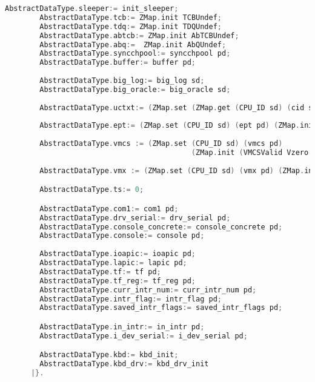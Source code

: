 \begin{lstlisting}[language=C]
        AbstractDataType.sleeper:= init_sleeper;
        AbstractDataType.tcb:= ZMap.init TCBUndef;
        AbstractDataType.tdq:= ZMap.init TDQUndef;
        AbstractDataType.abtcb:= ZMap.init AbTCBUndef;
        AbstractDataType.abq:=  ZMap.init AbQUndef;
        AbstractDataType.syncchpool:= syncchpool pd;
        AbstractDataType.buffer:= buffer pd;
        
        AbstractDataType.big_log:= big_log sd;
        AbstractDataType.big_oracle:= big_oracle sd;
        
        AbstractDataType.uctxt:= (ZMap.set (ZMap.get (CPU_ID sd) (cid sd)) (uctxt pd)  (ZMap.init (ZMap.init Vundef)));
        
        AbstractDataType.ept:= (ZMap.set (CPU_ID sd) (ept pd) (ZMap.init (ZMap.init EPML4EUndef)));
        
        AbstractDataType.vmcs := (ZMap.set (CPU_ID sd) (vmcs pd) 
                                           (ZMap.init (VMCSValid Vzero Vzero (ZMap.init Vundef))));
        
        AbstractDataType.vmx := (ZMap.set (CPU_ID sd) (vmx pd) (ZMap.init (ZMap.init Vundef)));

        AbstractDataType.ts:= 0;

        AbstractDataType.com1:= com1 pd;
        AbstractDataType.drv_serial:= drv_serial pd;
        AbstractDataType.console_concrete:= console_concrete pd;
        AbstractDataType.console:= console pd;
        
        AbstractDataType.ioapic:= ioapic pd;
        AbstractDataType.lapic:= lapic pd; 
        AbstractDataType.tf:= tf pd;
        AbstractDataType.tf_reg:= tf_reg pd;
        AbstractDataType.curr_intr_num:= curr_intr_num pd;
        AbstractDataType.intr_flag:= intr_flag pd;
        AbstractDataType.saved_intr_flags:= saved_intr_flags pd;

        AbstractDataType.in_intr:= in_intr pd;
        AbstractDataType.i_dev_serial:= i_dev_serial pd;

        AbstractDataType.kbd:= kbd_init;
        AbstractDataType.kbd_drv:= kbd_drv_init
      |}.
\end{lstlisting}

